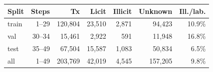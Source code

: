 \begin{tabular}{@{}lrrrrrr@{}}
\toprule
Split & Steps & Tx & Licit & Illicit & Unknown & Ill./lab. \\
\midrule
train & 1--29 & 120,804 & 23,510 & 2,871 & 94,423 & 10.9\% \\
val & 30--34 & 15,461 & 2,922 & 591 & 11,948 & 16.8\% \\
test & 35--49 & 67,504 & 15,587 & 1,083 & 50,834 & 6.5\% \\
\midrule
all & 1--49 & 203,769 & 42,019 & 4,545 & 157,205 & 9.8\% \\
\bottomrule
\end{tabular}

